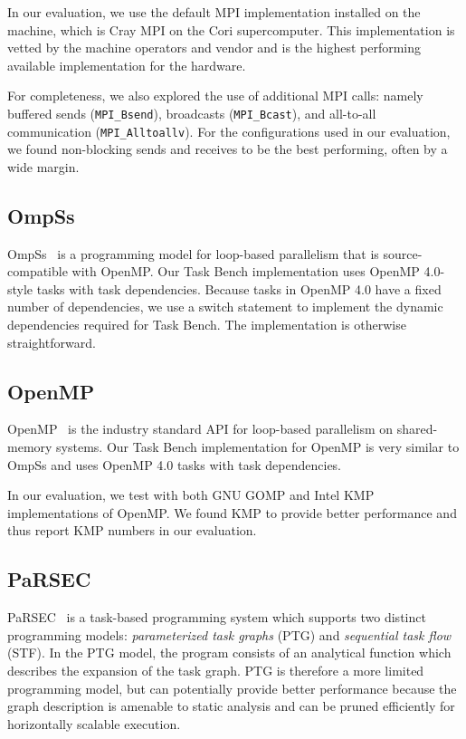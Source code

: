 In our evaluation, we use the default MPI implementation installed on
the machine, which is Cray MPI on the Cori supercomputer. This
implementation is vetted by the machine operators and vendor and is
the highest performing available implementation for the hardware.

For completeness, we also explored the use of additional MPI calls:
namely buffered sends (\lstinline[language=C++]{MPI_Bsend}),
broadcasts (\lstinline[language=C++]{MPI_Bcast}), and all-to-all
communication (\lstinline[language=C++]{MPI_Alltoallv}). For the
configurations used in our evaluation, we found non-blocking sends and
receives to be the best performing, often by a wide margin.

\subsection{OmpSs}

OmpSs~\cite{OmpSs11} is a programming model for loop-based parallelism
that is source-compatible with OpenMP. Our Task Bench implementation
uses OpenMP 4.0-style tasks with task dependencies. Because tasks in
OpenMP 4.0 have a fixed number of dependencies, we use a switch
statement to implement the dynamic dependencies required for Task
Bench. The implementation is otherwise straightforward.


\subsection{OpenMP}

OpenMP~\cite{OpenMPSpec40} is the industry standard API for loop-based
parallelism on shared-memory systems. Our Task Bench implementation
for OpenMP is very similar to OmpSs and uses OpenMP 4.0 tasks with
task dependencies.

In our evaluation, we test with both GNU GOMP and Intel KMP
implementations of OpenMP. We found KMP to provide better performance
and thus report KMP numbers in our evaluation.

\subsection{PaRSEC}

PaRSEC~\cite{PARSEC13} is a task-based programming system which
supports two distinct programming models: \emph{parameterized task
  graphs} (PTG) and \emph{sequential task flow} (STF). In the PTG
model, the program consists of an analytical function which describes
the expansion of the task graph. PTG is therefore a more limited
programming model, but can potentially provide better performance
because the graph description is amenable to static analysis and can
be pruned efficiently for horizontally scalable execution.

